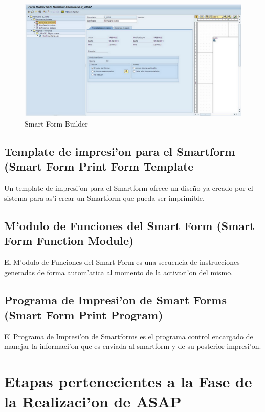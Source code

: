 \begin{figure}[H]
\centering
\includegraphics[scale=0.65,type=jpg,ext=.jpg,read=.jpg]{figures/builder}
\caption{Smart Form Builder}
\label{fig:builder}
\end{figure}
\subsection{Template de impresi'on para el Smartform (Smart Form Print Form Template}
	Un template de impresi'on para el Smartform ofrece un dise\~no ya creado por el sistema para as'i crear un Smartform que pueda ser imprimible.
\subsection{M'odulo de Funciones del Smart Form (Smart Form Function Module)}
	El M'odulo de Funciones del Smart Form es una secuencia de instrucciones generadas de forma autom'atica al momento de la activaci'on del  mismo.
\subsection{Programa de Impresi'on de Smart Forms (Smart Form Print Program)}
	El Programa de Impresi'on de Smartforms es el programa control encargado de manejar la informaci'on que es enviada al smartform y de su posterior impresi'on. 
\section{Etapas pertenecientes a la Fase de la Realizaci'on de ASAP} \label{sect:etapas}
